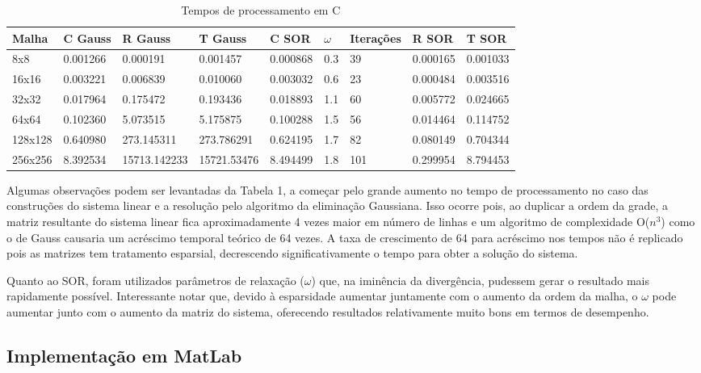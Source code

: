 \documentclass[
	article,			%
	11pt,				%
	oneside,			%
	a4paper,			%
	english,			%
	brazil,				%
	sumario=tradicional
	]{abntex2}
\begin{document}
\begin{table}[!h]
\centering
\caption{Tempos de processamento em C}
\label{my-label}
\begin{tabular}{|l|l|l|l|l|l|l|l|l|}
\hline
Malha   & C Gauss & R Gauss & T Gauss & C SOR & $\omega$ & Iterações & R SOR & T SOR \\ \hline
8x8     & 0.001266 & 0.000191 & 0.001457 & 0.000868 & 0.3 & 39 & 0.000165 & 0.001033 \\ \hline
16x16   & 0.003221 & 0.006839 & 0.010060 & 0.003032 & 0.6 & 23 & 0.000484 & 0.003516 \\ \hline
32x32   & 0.017964 & 0.175472 & 0.193436 & 0.018893 & 1.1 & 60 & 0.005772 & 0.024665 \\ \hline
64x64   & 0.102360 & 5.073515 & 5.175875 & 0.100288 & 1.5 & 56 & 0.014464 & 0.114752 \\ \hline
128x128 & 0.640980 & 273.145311 & 273.786291 & 0.624195 & 1.7 & 82 & 0.080149 & 0.704344 \\ \hline
256x256 & 8.392534 & 15713.142233 & 15721.53476 & 8.494499 & 1.8 & 101 & 0.299954 & 8.794453 \\ \hline
\end{tabular}
\end{table}

Algumas observações podem ser levantadas da Tabela 1, a começar pelo grande aumento no tempo de processamento no caso das construções do sistema linear e a resolução pelo algoritmo da eliminação Gaussiana. Isso ocorre pois, ao duplicar a ordem da grade, a matriz resultante do sistema linear fica aproximadamente 4 vezes maior em número de linhas e um algoritmo de complexidade O($n^3$) como o de Gauss causaria um acréscimo temporal teórico de 64 vezes. A taxa de crescimento de 64 para acréscimo nos tempos não é replicado pois as matrizes tem tratamento esparsial, decrescendo significativamente o tempo para obter a solução do sistema.

Quanto ao SOR, foram utilizados parâmetros de relaxação ($\omega$) que, na iminência da divergência, pudessem gerar o resultado mais rapidamente possível. Interessante notar que, devido à esparsidade aumentar juntamente com o aumento da ordem da malha, o $\omega$ pode aumentar junto com o aumento da matriz do sistema, oferecendo resultados relativamente muito bons em termos de desempenho.

\subsection{Implementação em MatLab}
\end{document}
